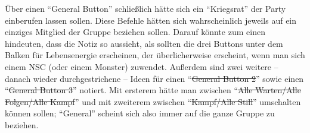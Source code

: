 \documentclass[12pt]{scrbook}
\begin{document}
Über einen \enquote{General Button} schließlich hätte sich ein \enquote{Kriegsrat} der Party einberufen lassen sollen.
Diese Befehle hätten sich wahrscheinlich jeweils auf ein einziges Mitglied der Gruppe beziehen sollen.
Darauf könnte zum einen hindeuten, dass die Notiz so aussieht, als sollten die drei Buttons unter dem Balken für Lebensenergie erscheinen, der überlicherweise erscheint, wenn man sich einem NSC (oder einem Monster) zuwendet.
Außerdem sind zwei weitere -- danach wieder durchgestrichene -- Ideen für einen \enquote{\sout{General Button 2}} sowie einen \enquote{\sout{General Button 3}} notiert.
Mit ersterem hätte man zwischen \enquote{\sout{Alle Warten/Alle Folgen/Alle Kampf}} und mit zweiterem zwischen \enquote{\sout{Kampf/Alle Still}} umschalten können sollen;\autocite[S.~5]{orpheus_interface} \enquote{General} scheint sich also immer auf die ganze Gruppe zu beziehen.
\end{document}
